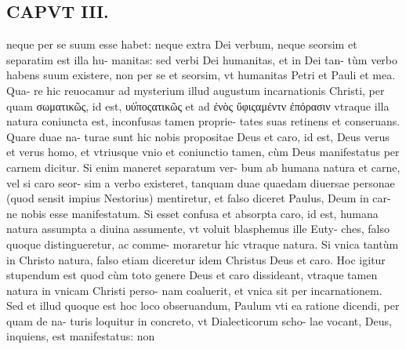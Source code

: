 \documentclass{article}
\begin{document}
\begin{pages}
\section*{CAPVT  III. }\pstart neque per se suum esse habet: neque extra Dei verbum, neque seorsim et separatim est illa hu- manitas: sed verbi Dei humanitas, et in Dei tan- tùm verbo habens suum existere, non per se et seorsim, vt humanitas Petri et Pauli et mea. Qua- re hic reuocamur ad mysterium illud augustum incarnationis Christi, per quam σωματικῶς, id est, υὐ̔ποςατικῶς et ad ἐνὸς ὔφιςαμέντν ἐπόρασιν vtraque illa natura coniuncta est, inconfusas tamen proprie- tates suas retinens et conseruans. Quare duae na- turae sunt hic nobis propositae Deus et caro, id est, Deus verus et verus homo, et vtriusque vnio et coniunctio tamen, cùm Deus manifestatus per carnem dicitur. Si enim maneret separatum ver- bum ab humana natura et carne, vel si caro seor- sim a verbo existeret, tanquam duae quaedam diuersae personae (quod sensit impius Nestorius) mentiretur, et falso diceret Paulus, Deum in car- ne nobis esse manifestatum. Si esset confusa et absorpta caro, id est, humana natura assumpta a diuina assumente, vt voluit blasphemus ille Euty- ches, falso quoque distingueretur, ac comme- moraretur hic vtraque natura. Si vnica tantùm in Christo natura, falso etiam diceretur idem Christus Deus et caro. Hoc igitur stupendum est quod cùm toto genere Deus et caro dissideant, vtraque tamen natura in vnicam Christi perso- nam coaluerit, et vnica sit per incarnationem. Sed et illud quoque est hoc loco obseruandum, Paulum vti ea ratione dicendi, per quam de na- turis loquitur in concreto, vt Dialecticorum scho- lae vocant, Deus, inquiens, est manifestatus: non  \pend

\end{pages}
\end{document}

